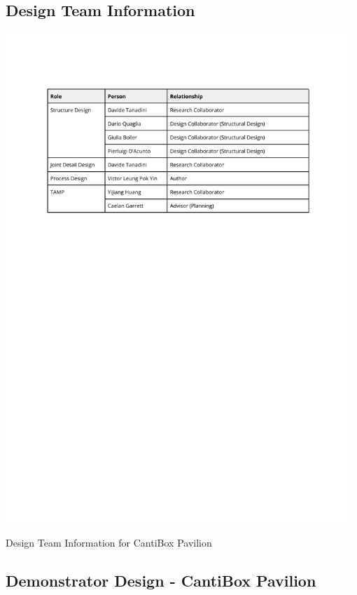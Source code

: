 \FloatBarrier

\subsection{Design Team Information}
\label{subsection:exploration-5-design-team-information}

\begin{table}[!h]
    \includegraphics[page=1, trim=25.4mm 180mm 25.4mm 33mm, clip, width=0.98\textwidth]{tables/Tables in Chapter 8.pdf}
    \caption{Design Team Information for CantiBox Pavilion}
\end{table}

\FloatBarrier

\subsection{Demonstrator Design - CantiBox Pavilion}
\label{subsection:exploration-5-demonstrator-design-cantibox-pavilion}

